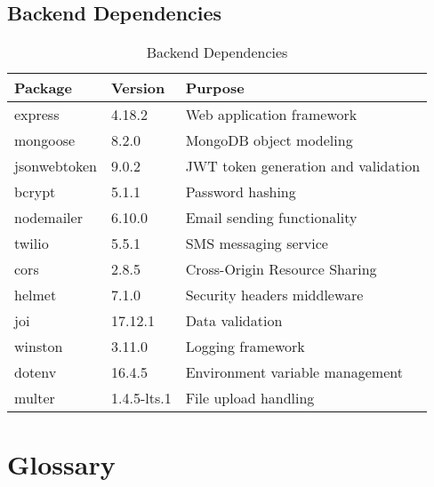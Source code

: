 \documentclass[12pt,a4paper]{article}
\begin{document}
\subsection{Backend Dependencies}
\begin{table}[H]
\centering
\begin{tabular}{|p{4cm}|p{2cm}|p{8cm}|}
\hline
\textbf{Package} & \textbf{Version} & \textbf{Purpose} \\
\hline
express & 4.18.2 & Web application framework \\
\hline
mongoose & 8.2.0 & MongoDB object modeling \\
\hline
jsonwebtoken & 9.0.2 & JWT token generation and validation \\
\hline
bcrypt & 5.1.1 & Password hashing \\
\hline
nodemailer & 6.10.0 & Email sending functionality \\
\hline
twilio & 5.5.1 & SMS messaging service \\
\hline
cors & 2.8.5 & Cross-Origin Resource Sharing \\
\hline
helmet & 7.1.0 & Security headers middleware \\
\hline
joi & 17.12.1 & Data validation \\
\hline
winston & 3.11.0 & Logging framework \\
\hline
dotenv & 16.4.5 & Environment variable management \\
\hline
multer & 1.4.5-lts.1 & File upload handling \\
\hline
\end{tabular}
\caption{Backend Dependencies}
\end{table}

\section{Glossary}\label{appendix:glossary}
\end{document}

